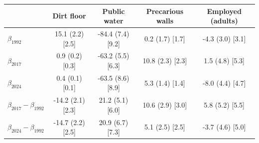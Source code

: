 \begin{tabular}{lcccc}
\toprule
 & Dirt floor & Public water & Precarious walls & Employed (adults) \\
\midrule
$\beta_{1992}$ & 15.1 (2.2) [2.5] & -84.4 (7.4) [9.2] & 0.2 (1.7) [1.7] & -4.3 (3.0) [3.1] \\
$\beta_{2017}$ & 0.9 (0.2) [0.3] & -63.2 (5.5) [6.3] & 10.8 (2.3) [2.3] & 1.5 (4.8) [5.3] \\
$\beta_{2024}$ & 0.4 (0.1) [0.1] & -63.5 (8.6) [8.9] & 5.3 (1.4) [1.4] & -8.0 (4.4) [4.7] \\
\midrule
$\beta_{2017}-\beta_{1992}$ & -14.2 (2.1) [2.3] & 21.2 (5.1) [6.0] & 10.6 (2.9) [3.0] & 5.8 (5.2) [5.5] \\
$\beta_{2024}-\beta_{1992}$ & -14.7 (2.2) [2.5] & 20.9 (6.7) [7.3] & 5.1 (2.5) [2.5] & -3.7 (4.6) [5.0] \\
\bottomrule
\end{tabular}
